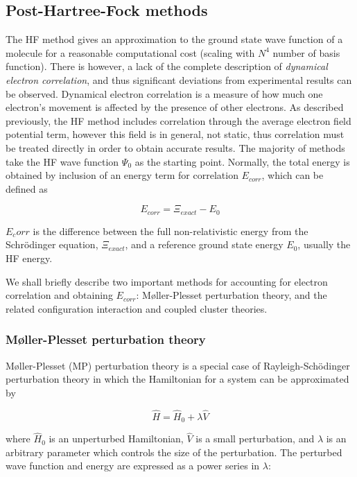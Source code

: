 \subsection{Post-Hartree-Fock methods}

The HF method gives an approximation to the ground state wave function of a molecule for a reasonable computational cost (scaling with $N^4$ number of basis function). There is however, a lack of the complete description of \emph{dynamical electron correlation},\cite{Cramer2004} and thus significant deviations from experimental results can be observed. Dynamical electron correlation is a measure of how much one electron's movement is affected by the presence of other electrons. As described previously, the HF method includes correlation through the average electron field potential term, however this field is in general, not static, thus correlation must be treated directly in order to obtain accurate results. The majority of methods take the HF wave function $\Psi_0$ as the starting point. Normally, the total energy is obtained by inclusion of an energy term for correlation $E_{corr}$, which can be defined as

\begin{equation}
  E_{corr} = \Xi_{exact} - E_0
\end{equation}

\noindent $E_corr$ is the difference between the full non-relativistic energy from the Schr{\"o}dinger equation, $\Xi_{exact}$, and a reference ground state energy $E_0$, usually the HF energy.

We shall briefly describe two important methods for accounting for electron correlation and obtaining $E_{corr}$: M{\o}ller-Plesset perturbation theory, and the related configuration interaction and coupled cluster theories.

\subsubsection{M{\o}ller-Plesset perturbation theory}

M{\o}ller-Plesset (MP) perturbation theory is a special case of Rayleigh-Sch{\"o}dinger perturbation theory in which the Hamiltonian for a system can be approximated by

\begin{equation}
  \hat{H} = \hat{H}_0 + \lambda\hat{V}
\end{equation}

\noindent where $\hat{H}_0$ is an unperturbed Hamiltonian, $\hat{V}$ is a small perturbation, and $\lambda$ is an arbitrary parameter which controls the size of the perturbation. The perturbed wave function and energy are expressed as a power series in $\lambda$:


